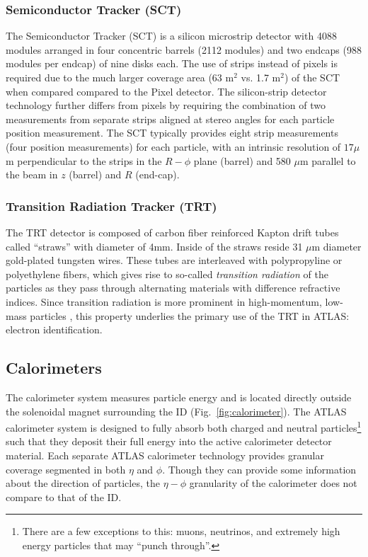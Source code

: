 \subsubsection{Semiconductor Tracker (SCT)}
The Semiconductor Tracker (SCT) is a silicon microstrip detector with 4088 modules arranged in four concentric barrels (2112 modules) and two endcaps (988 modules per endcap) of nine disks each.
The use of strips instead of pixels is required due to the much larger coverage area (63 $\mathrm{m}^2$ vs. 1.7 $\mathrm{m}^2$) of the SCT when compared compared to the Pixel detector.
The silicon-strip detector technology further differs from pixels by requiring the combination of two measurements from separate strips aligned at stereo angles for each particle position measurement.
The SCT typically provides eight strip measurements (four position measurements) for each particle, with an intrinsic resolution of $17 \mu$m perpendicular to the strips in the $R-\phi$ plane (barrel) and 580 $\mu$m parallel to the beam in $z$ (barrel) and $R$ (end-cap).

\subsubsection{Transition Radiation Tracker (TRT)} 
The TRT detector is composed of carbon fiber reinforced Kapton drift tubes called ``straws'' with diameter of 4mm.
Inside of the straws reside 31 $\mu$m diameter gold-plated tungsten wires.
These tubes are interleaved with polypropyline or polyethylene fibers, which gives rise to so-called \textit{transition radiation} of the particles as they pass through alternating materials with difference refractive indices.
Since transition radiation is more prominent in high-momentum, low-mass particles \cite{Andronic_2012}, this property underlies the primary use of the TRT in ATLAS: electron identification.

\subsection{Calorimeters}
\label{sec:calorimeters}

The calorimeter system measures particle energy and is located directly outside the solenoidal magnet surrounding the ID (Fig.~\ref{fig:calorimeter}).
The ATLAS calorimeter system is designed to fully absorb both charged and neutral particles\footnote{There are a few exceptions to this: muons, neutrinos, and extremely high energy particles that may ``punch through''.} such that they deposit their full energy into the active calorimeter detector material.
Each separate ATLAS calorimeter technology provides granular coverage segmented in both $\eta$ and $\phi$.
Though they can provide some information about the direction of particles, the $\eta-\phi$ granularity of the calorimeter does not compare to that of the ID.

